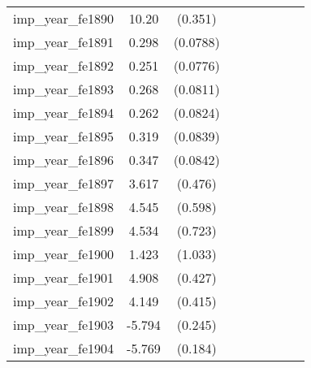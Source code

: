 {\begin{tabular}{l*{4}{cc}}
imp\_year\_fe1890&    10.20\sym{***}&  (0.351)&                  &         &                  &         &                  &         \\
imp\_year\_fe1891&    0.298\sym{***}& (0.0788)&                  &         &                  &         &                  &         \\
imp\_year\_fe1892&    0.251\sym{**} & (0.0776)&                  &         &                  &         &                  &         \\
imp\_year\_fe1893&    0.268\sym{***}& (0.0811)&                  &         &                  &         &                  &         \\
imp\_year\_fe1894&    0.262\sym{**} & (0.0824)&                  &         &                  &         &                  &         \\
imp\_year\_fe1895&    0.319\sym{***}& (0.0839)&                  &         &                  &         &                  &         \\
imp\_year\_fe1896&    0.347\sym{***}& (0.0842)&                  &         &                  &         &                  &         \\
imp\_year\_fe1897&    3.617\sym{***}&  (0.476)&                  &         &                  &         &                  &         \\
imp\_year\_fe1898&    4.545\sym{***}&  (0.598)&                  &         &                  &         &                  &         \\
imp\_year\_fe1899&    4.534\sym{***}&  (0.723)&                  &         &                  &         &                  &         \\
imp\_year\_fe1900&    1.423         &  (1.033)&                  &         &                  &         &                  &         \\
imp\_year\_fe1901&    4.908\sym{***}&  (0.427)&                  &         &                  &         &                  &         \\
imp\_year\_fe1902&    4.149\sym{***}&  (0.415)&                  &         &                  &         &                  &         \\
imp\_year\_fe1903&   -5.794\sym{***}&  (0.245)&                  &         &                  &         &                  &         \\
imp\_year\_fe1904&   -5.769\sym{***}&  (0.184)&                  &         &                  &         &                  &         \\

\end{tabular}}
